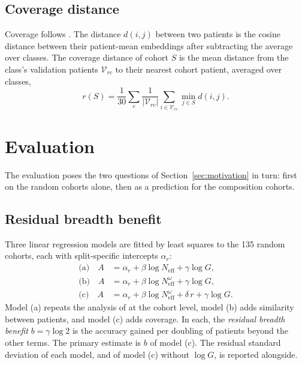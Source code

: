 \documentclass[11pt]{article}
\newcommand{\Neff}{N_{\mathrm{eff}}}
\begin{document}
\subsection{Coverage distance}
\label{sec:coverage}
Coverage follows \citet{queisler2026cohortComposition}. The distance $d(i,j)$ between two patients is the cosine distance between their patient-mean embeddings after subtracting the average over classes. The coverage distance of cohort $S$ is the mean distance from the class's validation patients $\mathcal V_{rc}$ to their nearest cohort patient, averaged over classes,
\begin{equation}
 r(S)=\frac{1}{30}\sum_{c}\frac{1}{|\mathcal V_{rc}|}\sum_{i\in\mathcal V_{rc}}\min_{j\in S}d(i,j).
 \label{eq:coverage}
\end{equation}

\section{Evaluation}
\label{sec:evaluation}
The evaluation poses the two questions of Section~\ref{sec:motivation} in turn: first on the random cohorts alone, then as a prediction for the composition cohorts.

\subsection{Residual breadth benefit}
\label{sec:residual}
Three linear regression models are fitted by least squares to the 135 random cohorts, each with split-specific intercepts $\alpha_r$:
\begin{align}
 \text{(a)}\quad A&=\alpha_r+\beta\log\Neff+\gamma\log G,\nonumber\\
 \text{(b)}\quad A&=\alpha_r+\beta\log\Neff^{\omega}+\gamma\log G,\label{eq:models}\\
 \text{(c)}\quad A&=\alpha_r+\beta\log\Neff^{\omega}+\delta\,r+\gamma\log G.\nonumber
\end{align}
\noindent Model (a) repeats the analysis of \citet{queisler2026multidirectionalRedundancy} at the cohort level, model (b) adds similarity between patients, and model (c) adds coverage. In each, the \emph{residual breadth benefit} $b=\gamma\log 2$ is the accuracy gained per doubling of patients beyond the other terms. The primary estimate is $b$ of model (c). The residual standard deviation of each model, and of model (c) without $\log G$, is reported alongside.
\end{document}
